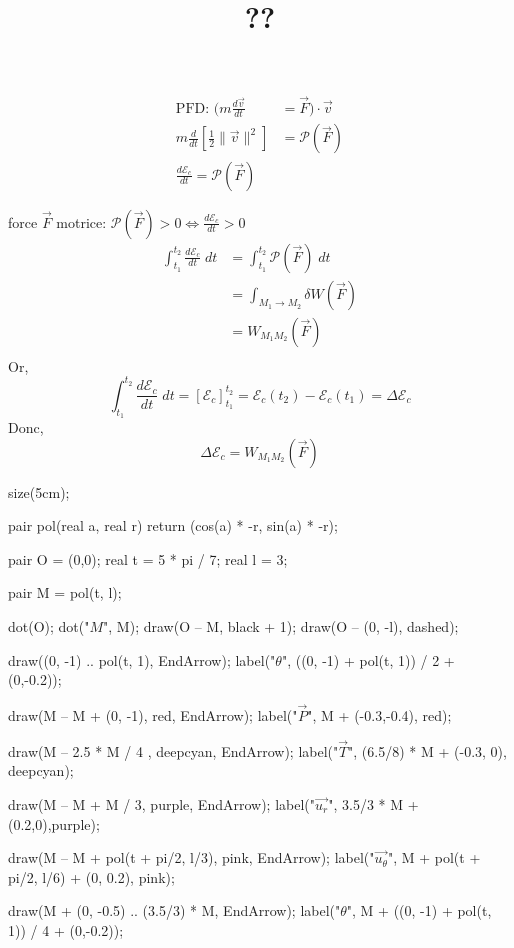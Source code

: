 \documentclass[a4paper]{report}
\title{??}{\'Energie}{Hugo \sc Salou}
\begin{document}
	\begin{align*}
		\text{PFD: } \bigg( m \frac{d \vec{v}}{dt} &= \vec{F} \bigg) \cdot \vec{v}\\
		m\frac{d}{dt}\left[ \frac{1}{2} \|\vec{v}\|^2 \right] &= \mathcal{P}(\vec{F})\\
		\frac{d \mathcal{E}_c}{dt} = \mathcal{P}(\vec{F})
	\end{align*}

	force $\vec{F}$ motrice: $\mathcal{P}(\vec{F}) > 0 \iff \frac{d \mathcal{E}_c}{dt} > 0$ \\

	\begin{align*}
		\int_{t_1}^{t_2} \frac{d \mathcal{E}_c}{dt} \; dt &= \int_{t_1}^{t_2} \mathcal{P}(\vec{F}) \;dt\\
		&= \int_{M_1 \to M_2} \delta W(\vec{F})  \\
		&= W_{M_1M_2}(\vec{F}) \\
	\end{align*}
	Or,  \[
		\int_{t_1}^{t_2} \frac{d \mathcal{E}_c}{dt}\; dt = \left[ \mathcal{E}_c \right]_{t_1}^{t_2} = \mathcal{E}_c(t_2) - \mathcal{E}_c(t_1) = \Delta \mathcal{E}_c
	\] Donc, \[
		\Delta \mathcal{E}_c = W_{M_1M_2}(\vec{F})
	\]

	\begin{center}
		\begin{asy}
			size(5cm);

			pair pol(real a, real r) {return (cos(a) * -r, sin(a) * -r);}

			pair O = (0,0);
			real t = 5 * pi / 7;
			real l = 3;

			pair M = pol(t, l);

			dot(O);
			dot("$M$", M);
			draw(O -- M, black + 1);
			draw(O -- (0, -l), dashed);

			draw((0, -1) .. pol(t, 1), EndArrow);
			label("$\theta$", ((0, -1) + pol(t, 1)) / 2 + (0,-0.2));

			draw(M -- M + (0, -1), red, EndArrow);
			label("$\vec{P}$", M + (-0.3,-0.4), red);

			draw(M -- 2.5 * M / 4 , deepcyan, EndArrow);
			label("$\vec{T}$", (6.5/8) * M + (-0.3, 0), deepcyan);

			draw(M -- M + M / 3, purple, EndArrow);
			label("$\vec{u_{r}}$", 3.5/3 * M + (0.2,0),purple);

			draw(M -- M + pol(t + pi/2, l/3), pink, EndArrow);
			label("$\vec{u_{\theta}}$", M + pol(t + pi/2, l/6) + (0, 0.2), pink);

			draw(M + (0, -0.5) .. (3.5/3) * M, EndArrow);
			label("$\theta$", M + ((0, -1) + pol(t, 1)) / 4 + (0,-0.2));
		\end{asy}
	\end{center}
\end{document}
